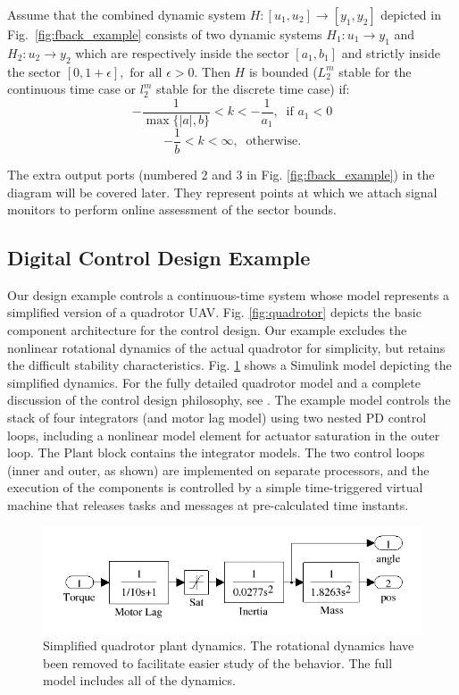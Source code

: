 Assume that the combined dynamic system $H:[u_1,u_2] \to
[y_1,y_2]$ depicted in Fig.~\ref{fig:fback_example} consists
of two dynamic systems $H_1:u_1 \to y_1$ and $H_2:u_2 \to y_2$ which
are respectively inside the sector $[a_1,b_1]$ and strictly inside the
sector $[0,1+\epsilon], \text{ for all } \epsilon > 0$.  Then $H$ is
bounded ($L^m_2$ stable for the continuous time case or $l^m_2$ stable
for the discrete time case) if:
\begin{equation*}
-\frac{1}{\max\{|a|,b\}} < k < -\frac{1}{a_1},\ \text{ if } a_1 < 0
\end{equation*}
\begin{equation*}
-\frac{1}{b} < k < \infty,\ \text{ otherwise.}
\end{equation*}

The extra output ports (numbered 2 and 3 in Fig. \ref{fig:fback_example}) in the diagram
will be covered later.  They represent points at which we attach signal monitors to perform
online assessment of the sector bounds.

\subsection{Digital Control Design Example}

Our design example controls a continuous-time system whose model represents a simplified 
version of a quadrotor UAV.  Fig. \ref{fig:quadrotor} depicts the basic
component architecture for the control design.  Our example excludes the
nonlinear rotational dynamics of the actual quadrotor for simplicity, but
retains the difficult stability characteristics. Fig. \ref{fig:qr_plant} shows
a Simulink model depicting the simplified dynamics.  For the fully detailed
quadrotor model and a complete discussion of the control design philosophy, see
\cite{quad:passcontrol}. The example model controls the stack of four
integrators (and motor lag model) using two nested PD control loops, including a nonlinear 
model element for actuator saturation in the outer loop.
The Plant block contains the
integrator models. The two control loops (inner and outer, as shown) are
implemented on separate processors, and the execution of the components is
controlled by a simple time-triggered virtual machine that releases tasks and
messages at pre-calculated time instants.

\begin{figure}[htb]
\centering
\includegraphics[width=\columnwidth]{figures/quadrotor_plant}
    \caption{Simplified quadrotor plant dynamics.  The rotational dynamics have
been removed to facilitate easier study of the behavior.  The full model
includes all of the dynamics.}
    \label{fig:qr_plant}
\end{figure}


